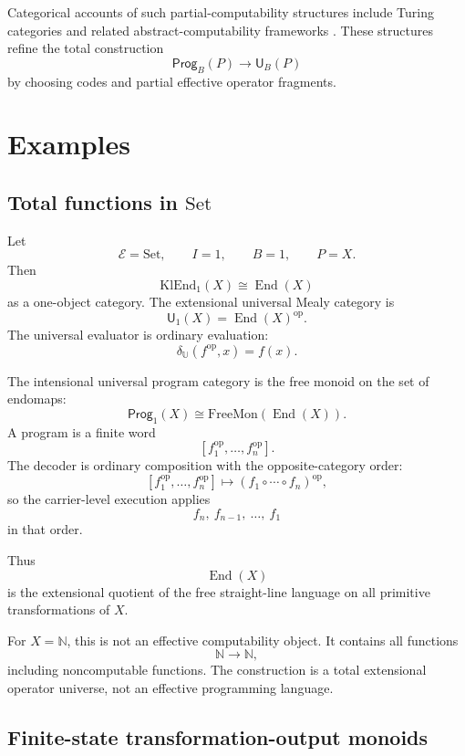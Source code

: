 Categorical accounts of such partial-computability structures include Turing categories and
related abstract-computability frameworks \cite{CockettHofstra2008}.  These structures refine the
total construction
\[
        \mathsf{Prog}_B(P)\to\mathsf U_B(P)
\]
by choosing codes and partial effective operator fragments.

\section{Examples}
\label{sec:universal-mealy-examples}

\subsection{Total functions in \(\mathrm{Set}\)}

Let
\[
        \mathcal E=\mathrm{Set},
        \qquad
        I=1,
        \qquad
        B=1,
        \qquad
        P=X.
\]
Then
\[
        \mathrm{KlEnd}_1(X)\cong \operatorname{End}(X)
\]
as a one-object category.  The extensional universal Mealy category is
\[
        \mathsf U_1(X)=\operatorname{End}(X)^{\operatorname{op}}.
\]
The universal evaluator is ordinary evaluation:
\[
        \delta_{\mathbb U}(f^{\operatorname{op}},x)=f(x).
\]

The intensional universal program category is the free monoid on the set of endomaps:
\[
        \mathsf{Prog}_1(X)
        \cong
        \mathrm{FreeMon}(\operatorname{End}(X)).
\]
A program is a finite word
\[
        [f_1^{\operatorname{op}},\ldots,f_n^{\operatorname{op}}].
\]
The decoder is ordinary composition with the opposite-category order:
\[
        [f_1^{\operatorname{op}},\ldots,f_n^{\operatorname{op}}]
        \longmapsto
        (f_1\circ\cdots\circ f_n)^{\operatorname{op}},
\]
so the carrier-level execution applies
\[
        f_n,\ f_{n-1},\ \ldots,\ f_1
\]
in that order.

Thus
\[
        \operatorname{End}(X)
\]
is the extensional quotient of the free straight-line language on all primitive transformations of
\(X\).

For \(X=\mathbb N\), this is not an effective computability object.  It contains all functions
\[
        \mathbb N\to\mathbb N,
\]
including noncomputable functions.  The construction is a total extensional operator universe, not
an effective programming language.

\subsection{Finite-state transformation-output monoids}


